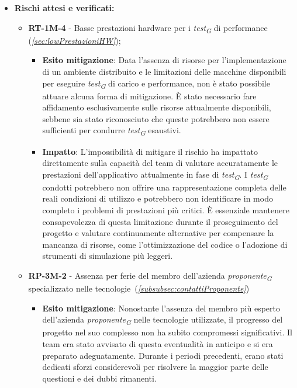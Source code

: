 \begin{itemize}
    \item \textbf{Rischi attesi e verificati:}
        \begin{itemize}
            \item \textbf{RT-1M-4} - Basse prestazioni hardware per i \textit{test}\textsubscript{\textit{G}} di performance (\textit{\ref{sec:lowPrestazioniHW}});
            \begin{itemize}
                \item \textbf{Esito mitigazione}: Data l'assenza di risorse per l'implementazione di un ambiente distribuito e le limitazioni delle macchine disponibili per eseguire \textit{test}\textsubscript{\textit{G}} di carico e performance, non è stato possibile attuare alcuna forma di mitigazione. È stato necessario fare affidamento esclusivamente sulle risorse attualmente disponibili, sebbene sia stato riconosciuto che queste potrebbero non essere sufficienti per condurre \textit{test}\textsubscript{\textit{G}} esaustivi.
                \item \textbf{Impatto}: L'impossibilità di mitigare il rischio ha impattato direttamente sulla capacità del team di valutare accuratamente le prestazioni dell'applicativo attualmente in fase di \textit{test}\textsubscript{\textit{G}}. I \textit{test}\textsubscript{\textit{G}} condotti potrebbero non offrire una rappresentazione completa delle reali condizioni di utilizzo e potrebbero non identificare in modo completo i problemi di prestazioni più critici. È essenziale mantenere consapevolezza di questa limitazione durante il proseguimento del progetto e valutare continuamente alternative per compensare la mancanza di risorse, come l'ottimizzazione del codice o l'adozione di strumenti di simulazione più leggeri.
            \end{itemize}
            \item \textbf{RP-3M-2} - Assenza per ferie del membro dell'azienda \textit{proponente}\textsubscript{\textit{G}} specializzato nelle tecnologie~(\textit{\ref{subsubsec:contattiProponente}})
                \begin{itemize}
                    \item \textbf{Esito mitigazione}: Nonostante l'assenza del membro più esperto dell'azienda \textit{proponente}\textsubscript{\textit{G}} nelle tecnologie utilizzate, il progresso del progetto nel suo complesso non ha subito compromessi significativi. Il team era stato avvisato di questa eventualità in anticipo e si era preparato adeguatamente. Durante i periodi precedenti, erano stati dedicati sforzi considerevoli per risolvere la maggior parte delle questioni e dei dubbi rimanenti.

\end{itemize}
\end{itemize}
\end{itemize}
